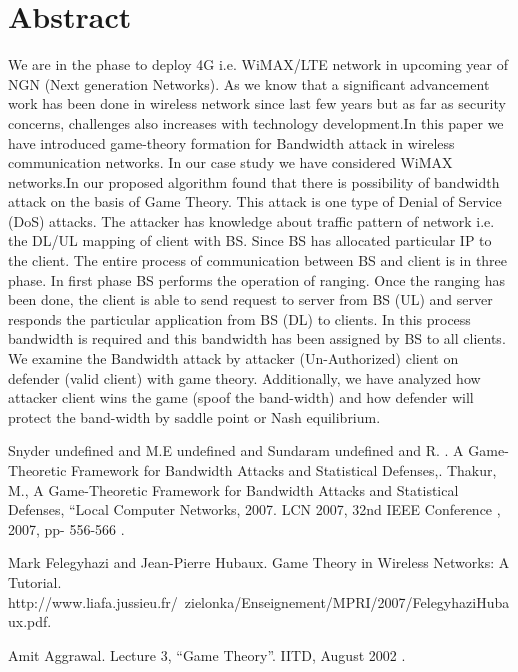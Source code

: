 \documentclass[article, A4, 11pt]{llncs}%
\begin{document}
\section*{Abstract}
We are in the phase to deploy 4G i.e. WiMAX/LTE network in upcoming year of NGN (Next generation Networks). As we know that a significant advancement work has been done in wireless network since last few years but as far as security concerns, challenges also increases with technology development.In this paper we have introduced game-theory formation for Bandwidth attack in wireless communication networks. In our case study we have considered WiMAX networks.In our proposed algorithm found that there is possibility of bandwidth attack on the basis of Game Theory. This attack is one type of Denial of Service (DoS) attacks. The attacker has knowledge about traffic pattern of network i.e. the DL/UL mapping of client with BS. Since BS has allocated particular IP to the client. The entire process of communication between BS and client is in three phase. In first phase BS performs the operation of ranging. Once the ranging has been done, the client is able to send request to server from BS (UL) and server responds the particular application from BS (DL) to clients. In this process bandwidth is required and this bandwidth has been assigned by BS to all clients. We examine the Bandwidth attack by attacker (Un-Authorized) client on defender (valid client) with game theory. Additionally, we have analyzed how attacker client wins the game (spoof the band-width) and how defender will protect the band-width by saddle point or Nash equilibrium.


\begin{thebibliography}{10}
{\sc Snyder undefined and M.E undefined and Sundaram undefined and R. }. {A Game-Theoretic Framework for Bandwidth Attacks and Statistical Defenses,}. Thakur, M., A Game-Theoretic Framework for Bandwidth Attacks and Statistical Defenses, “Local Computer Networks, 2007. LCN 2007, 32nd IEEE Conference , 2007, pp- 556-566 .

{\sc Mark Felegyhazi and Jean-Pierre Hubaux}. {Game Theory in Wireless Networks: A Tutorial}. http://www.liafa.jussieu.fr/~zielonka/Enseignement/MPRI/2007/FelegyhaziHubaux.pdf.

{\sc Amit Aggrawal}. {Lecture 3, “Game Theory”}. IITD, August 2002 .
\end{thebibliography} %
\end{document}
